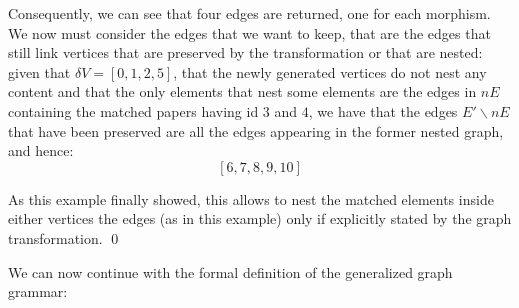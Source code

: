 \begin{example}[continues=ex:firstforgrammars2,label=ex:firstforgrammars3]
Consequently, we can see that four edges are returned, one for each morphism. We now must consider the edges that we want to keep, that are the edges that still link vertices that are preserved by the transformation or that are nested: given that $\delta V = [0,1,2,5]$, that the newly generated vertices do not nest any content and that the only elements that nest some elements are the edges in $ nE$ containing the matched papers having id $3$ and $4$, we have that the edges $E'\backslash nE$ that have been preserved  are all the edges appearing in the former nested graph, and hence:
\[[6,7,8,9,10]\]

As this example finally showed, this allows to nest the matched elements inside either vertices the edges (as in this example) only if explicitly stated by the graph transformation. \qed
\end{example}

We can now continue with the formal definition of the generalized graph grammar:

